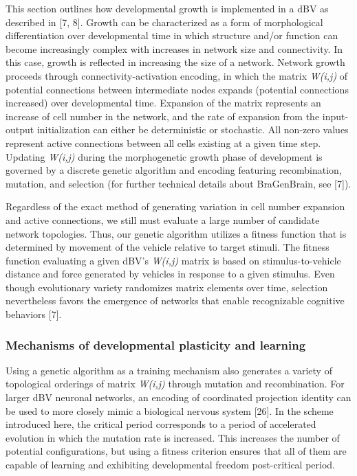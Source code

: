 \documentclass{article}
\begin{document}
This section outlines how developmental growth is implemented in a dBV as described in [7, 8]. Growth can be characterized as a form of morphological differentiation over developmental time in which structure and/or function can become increasingly complex with increases in network size and connectivity. In this case, growth is reflected in increasing the size of a network. Network growth proceeds through connectivity-activation encoding, in which the matrix {\it W(i,j)} of potential connections between intermediate nodes expands (potential connections increased) over developmental time. Expansion of the matrix represents an increase of cell number in the network, and the rate of expansion from the input-output initialization can either be deterministic or stochastic. All non-zero values represent active connections between all cells existing at a given time step. Updating {\it W(i,j)} during the morphogenetic growth phase of development is governed by a discrete genetic algorithm and encoding featuring recombination, mutation, and selection (for further technical details about BraGenBrain, see [7]). 

Regardless of the exact method of generating variation in cell number expansion and active connections, we still must evaluate a large number of candidate network topologies. Thus, our genetic algorithm utilizes a fitness function that is determined by movement of the vehicle relative to target stimuli. The fitness function evaluating a given dBV's {\it W(i,j)} matrix is based on stimulus-to-vehicle distance and force generated by vehicles in response to a given stimulus. Even though evolutionary variety randomizes matrix elements over time, selection nevertheless favors the emergence of networks that enable recognizable cognitive behaviors [7]. 

\subsubsection*{Mechanisms of developmental plasticity and learning}

Using a genetic algorithm as a training mechanism also generates a variety of topological orderings of matrix {\it W(i,j)} through mutation and recombination. For larger dBV neuronal networks, an encoding of coordinated projection identity can be used to more closely mimic a biological nervous system [26]. In the scheme introduced here, the critical period corresponds to a period of accelerated evolution in which the mutation rate is increased. This increases the number of potential configurations, but using a fitness criterion ensures that all of them are capable of learning and exhibiting developmental freedom post-critical period. 
\end{document}
